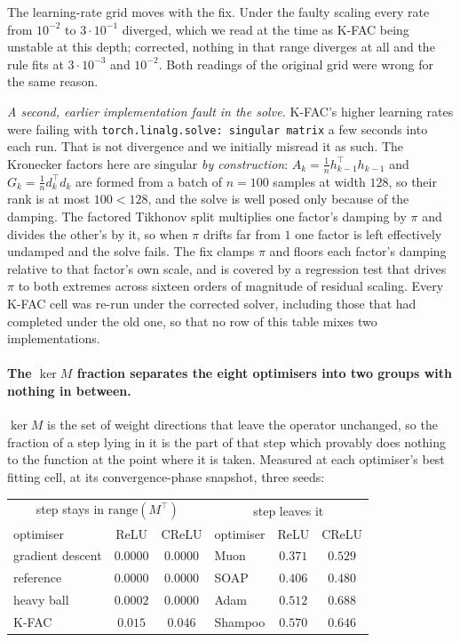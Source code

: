 \documentclass{article} %
\theoremstyle{plain}
\theoremstyle{definition}
\theoremstyle{remark}
\begin{document}
The learning-rate grid moves with the fix. Under the faulty scaling every rate from $10^{-2}$ to
$3\cdot10^{-1}$ diverged, which we read at the time as K-FAC being unstable at this depth;
corrected, nothing in that range diverges at all and the rule fits at $3\cdot10^{-3}$ and
$10^{-2}$. Both readings of the original grid were wrong for the same reason.

\emph{A second, earlier implementation fault in the solve.}
K-FAC's higher learning rates were failing with \texttt{torch.linalg.solve: singular matrix} a few
seconds into each run. That is not divergence and we initially misread it as such. The Kronecker
factors here are singular \emph{by construction}: $A_k = \frac{1}{n}h_{k-1}^\top h_{k-1}$ and
$G_k = \frac{1}{n}d_k^\top d_k$ are formed from a batch of $n = 100$ samples at width $128$, so
their rank is at most $100 < 128$, and the solve is well posed only because of the damping. The
factored Tikhonov split multiplies one factor's damping by $\pi$ and divides the other's by it, so
when $\pi$ drifts far from $1$ one factor is left effectively undamped and the solve fails. The fix
clamps $\pi$ and floors each factor's damping relative to that factor's own scale, and is covered
by a regression test that drives $\pi$ to both extremes across sixteen orders of magnitude of
residual scaling. Every K-FAC cell was re-run under the corrected solver, including those that had
completed under the old one, so that no row of this table mixes two implementations.

\paragraph{The $\ker M$ fraction separates the eight optimisers into two groups with nothing
in between.} $\ker M$ is the set of weight directions that leave the operator unchanged, so the
fraction of a step lying in it is the part of that step which provably does nothing to the function
at the point where it is taken. Measured at each optimiser's best fitting cell, at its
convergence-phase snapshot, three seeds:

\begin{center}\small
\begin{tabular}{lcc|lcc}
\toprule
\multicolumn{3}{c|}{step stays in $\mathrm{range}(M^\top)$} & \multicolumn{3}{c}{step leaves it} \\
optimiser & ReLU & CReLU & optimiser & ReLU & CReLU \\
\midrule
gradient descent & $0.0000$ & $0.0000$ & Muon    & $0.371$ & $0.529$ \\
reference        & $0.0000$ & $0.0000$ & SOAP    & $0.406$ & $0.480$ \\
heavy ball       & $0.0002$ & $0.0000$ & Adam    & $0.512$ & $0.688$ \\
K-FAC            & $0.015$  & $0.046$  & Shampoo & $0.570$ & $0.646$ \\
\bottomrule
\end{tabular}
\end{center}
\end{document}
